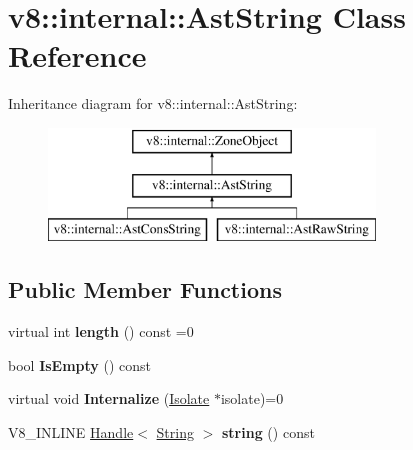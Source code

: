\hypertarget{classv8_1_1internal_1_1_ast_string}{}\section{v8\+:\+:internal\+:\+:Ast\+String Class Reference}
\label{classv8_1_1internal_1_1_ast_string}
Inheritance diagram for v8\+:\+:internal\+:\+:Ast\+String\+:\begin{figure}[H]
\begin{center}
\leavevmode
\includegraphics[height=3.000000cm]{classv8_1_1internal_1_1_ast_string}
\end{center}
\end{figure}
\subsection*{Public Member Functions}
\begin{DoxyCompactItemize}
\item 
\hypertarget{classv8_1_1internal_1_1_ast_string_a9a0be304251448c197840e6e3a2de4db}{}virtual int {\bfseries length} () const =0\label{classv8_1_1internal_1_1_ast_string_a9a0be304251448c197840e6e3a2de4db}

\item 
\hypertarget{classv8_1_1internal_1_1_ast_string_a9012cbd49b91d14842777274e713b068}{}bool {\bfseries Is\+Empty} () const \label{classv8_1_1internal_1_1_ast_string_a9012cbd49b91d14842777274e713b068}

\item 
\hypertarget{classv8_1_1internal_1_1_ast_string_a7781994a37eb574c340844cfb235dd25}{}virtual void {\bfseries Internalize} (\hyperlink{classv8_1_1internal_1_1_isolate}{Isolate} $\ast$isolate)=0\label{classv8_1_1internal_1_1_ast_string_a7781994a37eb574c340844cfb235dd25}

\item 
\hypertarget{classv8_1_1internal_1_1_ast_string_a44a57fccc07afe69c83171d66a334291}{}V8\+\_\+\+I\+N\+L\+I\+N\+E \hyperlink{classv8_1_1internal_1_1_handle}{Handle}$<$ \hyperlink{classv8_1_1internal_1_1_string}{String} $>$ {\bfseries string} () const \label{classv8_1_1internal_1_1_ast_string_a44a57fccc07afe69c83171d66a334291}

\end{DoxyCompactItemize}
